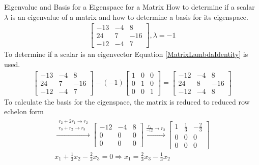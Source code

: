 \begin{example}{Eigenvalue and Basis for a Eigenspace for a Matrix}
How to determine if a scalar $\lambda$ is an eigenvalue of a matrix and how to determine a basis for its eigenspace.  
\begin{align*}
\begin{bmatrix}
    -13 & -4 & 8\\
    24 & 7 & -16\\
    -12 & -4 & 7
\end{bmatrix}, \lambda=-1
\end{align*}
To determine if a scalar is an eigenvector Equation \eqref{MatrixLambdaIdentity} is used.
\begin{align*}
\begin{bmatrix}
    -13 & -4 & 8\\
    24 & 7 & -16\\
    -12 & -4 & 7
\end{bmatrix} - (-1) 
\begin{bmatrix}
    1 & 0 & 0\\
    0 & 1 & 0 \\
    0 & 0 & 1
\end{bmatrix}=
\begin{bmatrix}
    -12 & -4 & 8 \\
    24 & 8 & -16 \\
    -12 & -4 & 8
\end{bmatrix}
\end{align*}
To calculate the basis for the eigenspace, the matrix is reduced to reduced row echelon form
\begin{align*}
   \xrightarrow{\substack{r_2+2r_1\rightarrow r_2\\r_3+r_2\rightarrow r_3}} 
   \begin{bmatrix}
        -12 & -4 & 8 \\
        0 & 0 & 0 \\
        0 & 0 & 0    
   \end{bmatrix}\xrightarrow{\frac{r_1}{-12}\rightarrow r_2}
   \begin{bmatrix}
       1 & \frac{1}{3} & -\frac{2}{3}  \\
        0 & 0 & 0 \\
        0 & 0 & 0 
   \end{bmatrix}\\
   x_1+\frac{1}{3}x_2-\frac{2}{3}x_3=0\Rightarrow x_1=\frac{2}{3}x_3-\frac{1}{3}x_2
\end{align*}


\end{example}
